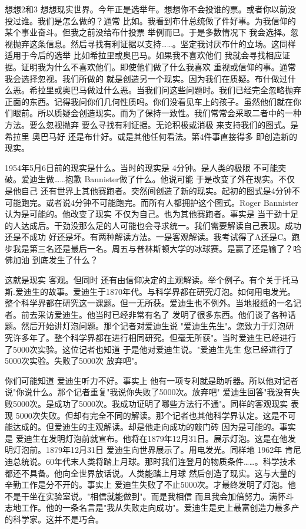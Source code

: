 想想2和3 想想现实世界。今年正是选举年。想想你不会投谁的票。或者你以前没投过谁。我们是怎么做的？通常 比如。我看到布什总统做了件好事。为我信仰的某个事业奋斗。但我之前没给布什投票 举例而已。于是多数情况下 我会选择。忽视抛弃这条信息。然后寻找有利证据以支持……。坚定我讨厌布什的立场。这同样适用于今后的选举 比如希拉里或奥巴马。如果我不喜欢他们 我就会寻找相应证据。证明我为什么不喜欢他们。即使他们做了什么我喜欢 重视或信仰的事。通常我会选择忽视。我们所做的 就是创造另一个现实。因为我们在质疑。布什做过什么恶。希拉里或奥巴马做过什么恶。当我们问这些问题时。我们已经完全忽略抛弃正面的东西。记得我问你们几何性质吗。你们没看见车上的孩子。虽然他们就在你们眼前。所以质疑会创造现实。而为了保持一致性。我们常常会采取二者中的一种方法。要么忽视抛弃 要么寻找有利证据。无论积极或消极 来支持我们的图式。是希拉里 奥巴马好 还是布什好。或是其他任何看法。第4件事直接得多 即创造新的现实。 

1954年5月6日前的现实是什么。当时的现实是 4分钟。是人类的极限 不可能突破。爱迪生做……抱歉 Bannister做了什么。他说可能 于是改变了外在现实。不仅是他自己 还有世界上其他赛跑者。突然间创造了新的现实。起初的图式是4分钟不可能跑完。或者说4分钟不可能跑完。而所有人都拥护这个图式。Roger Bannister认为是可能的。他改变了现实 不仅为自己。也为其他赛跑者。事实是 当干劲十足的人达成后。干劲没那么足的人可能也会寻求统一。我们需要解读自己表现。成功还是不成功 好还是坏。有两种解读方法。一是客观解读。我考试得了A还是C。跑步我是第三名还是最后一名。周五与普林斯顿大学的冰球赛。是赢了还是输了？哈佛加油 到底发生了什么？ 

这就是现实 客观。但同时 还有由信仰决定的主观解读。举个例子。有个关于托马斯.爱迪生的故事。爱迪生于1870年代。与科学界都在研究灯泡。如何用电发光。整个科学界都在研究这一课题。但一无所获。爱迪生也不例外。当地报纸的一名记者。前去采访爱迪生。他当时已经非常有名了 发明了很多东西。他们谈了各种话题。然后开始讲灯泡问题。那个记者对爱迪生说 "爱迪生先生"。您致力于灯泡研究许多年了。整个科学界都在进行相同研究。但毫无所获"。当时爱迪生已经进行了5000次实验。这位记者也知道 于是他对爱迪生说。"爱迪生先生 您已经进行了5000次实验。失败了5000次 放弃吧"。 

你们可能知道 爱迪生听力不好。事实上 他有一项专利就是助听器。所以他对记者说"你说什么。那个记者重复"我说你失败了5000次。放弃吧" 爱迪生回答"我没有失败5000次。是成功了5000次。我成功证明了哪些方法行不通"。同样的客观现实 表现 5000次失败。但却有完全不同的解读。那个记者也其他科学界认定。这是不可能达成的。但爱迪生的主观解读。却是他走向成功的敲门砖 因为是可能的。事实是 爱迪生在发明灯泡前就宣布。他将在1879年12月31日。展示灯泡。这是在他发明灯泡前。1879年12月31日 爱迪生向世界展示了。用电发光。同样地 1962年 肯尼迪总统说。60年代末人类将踏上月球。那时我们连登月的物质条件……。科学技术都还不具备。他向全世界放话说。人类能踏上月球 然后创造了现实。这与大量的辛勤工作是分不开的。事实上 爱迪生失败了不止5000次。才最终发明了灯泡。他不是干坐在实验室说。"相信就能做到"。而是我相信 而且我会加倍努力。满怀斗志地工作。他的一条名言是"我从失败走向成功"。爱迪生是史上最富创造力最多产的科学家。这并不是巧合。 

